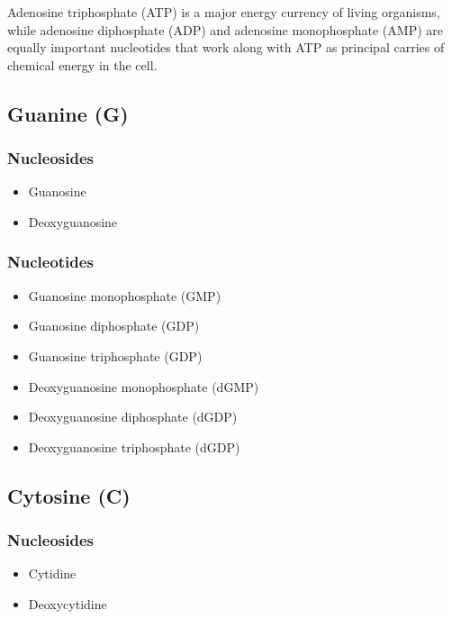 \documentclass[11pt]{article}
\begin{document}
Adenosine triphosphate (ATP) is a major energy currency of living organisms, while adenosine diphosphate (ADP) and adenosine monophosphate (AMP) are equally important nucleotides that work along with ATP as principal carries of chemical energy in the cell.

\newpage

\subsection{Guanine (G)}
\label{sec:org48e927c}

\subsubsection{Nucleosides}
\label{sec:org748311c}
\begin{itemize}
\item Guanosine
\item Deoxyguanosine
\end{itemize}

\subsubsection{Nucleotides}
\label{sec:orgf5dcae6}
\begin{itemize}
\item Guanosine monophosphate (GMP)
\item Guanosine diphosphate (GDP)
\item Guanosine triphosphate (GDP)
\item Deoxyguanosine monophosphate (dGMP)
\item Deoxyguanosine diphosphate (dGDP)
\item Deoxyguanosine triphosphate (dGDP)
\end{itemize}

\subsection{Cytosine (C)}
\label{sec:org93a5116}

\subsubsection{Nucleosides}
\label{sec:org229bd21}
\begin{itemize}
\item Cytidine
\item Deoxycytidine
\end{itemize}
\end{document}
